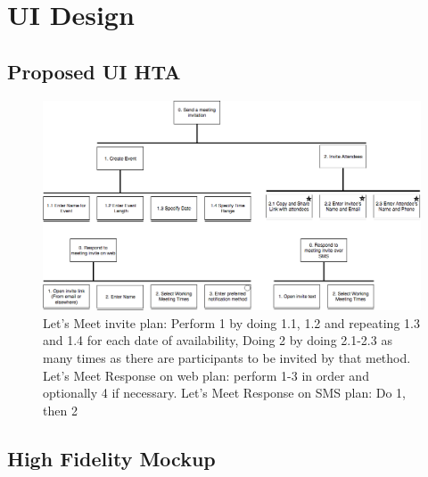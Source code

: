 \documentclass{sigchi}
\begin{document}
\FloatBarrier


\balance{}

\newpage




\section{UI Design}
\subsection{Proposed UI HTA}

\FloatBarrier
\begin{figure}
  \centering
  \includegraphics[width=1.75\columnwidth]{figures/LetsMeetHTA}
  \caption{Let's Meet invite plan: Perform 1 by doing 1.1, 1.2 and repeating 1.3 and 1.4 for each date of availability, Doing 2 by doing 2.1-2.3 as many times as there are participants to be invited by that method. Let's Meet Response on web plan: perform 1-3 in order and optionally 4 if necessary. Let's Meet Response on SMS plan: Do 1, then 2}
\end{figure}
\FloatBarrier

\subsection{High Fidelity Mockup}
\end{document}
